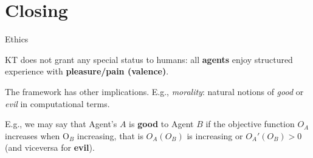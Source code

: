 \section{Closing}






 



\begin{frame}[label=ladila]{Ethics}

KT does not grant any special status to humans:  all \textbf{agents} enjoy structured experience with  \textbf{pleasure/pain (valence)}. \vfill


The framework has other implications. E.g.,  \textit{morality}:  natural notions of {\em good} or {\em evil} in computational terms. \vfill

E.g., we may say that Agent's $A$ is \textbf{good} to Agent $B$ if the objective function   $O_A$ increases when O$_B$ increasing, that is $O_A(O_B)$ is increasing or  $O_A'(O_B) >0$ (and viceversa for \textbf{evil}).
 \vfill
 

 
\end{frame}

